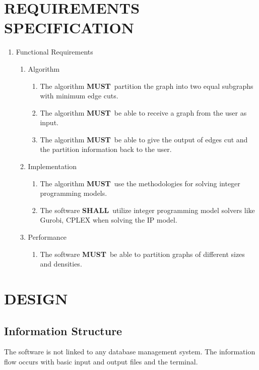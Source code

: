 \documentclass[a4paper,12pt]{report}
\newcommand{\must}{\textbf{MUST}}
\newcommand{\shall}{\textbf{SHALL}}
\begin{document}
\chapter{REQUIREMENTS SPECIFICATION}

\begin{enumerate}
	\item Functional Requirements
		\begin{enumerate}
			\item Algorithm
				\begin{enumerate}
					\item The algorithm \must\ partition the graph into two equal subgraphs with minimum edge cuts.
					\item The algorithm \must\ be able to receive a graph from the user as input.
					\item The algorithm \must\ be able to give the output of edges cut and the partition information back to the user.
				\end{enumerate}

			\item Implementation
				\begin{enumerate}
					\item The algorithm \must\ use the methodologies for solving integer programming models.
					\item The software \shall\ utilize integer programming model solvers like Gurobi, CPLEX when solving the IP model.
				\end{enumerate}
			\item Performance
				\begin{enumerate}
					\item The software \must\ be able to partition graphs of different sizes and densities.
				\end{enumerate}
		\end{enumerate}

\end{enumerate}


\chapter{DESIGN}

\section{Information Structure}

The software is not linked to any database management system. The information flow occurs with basic input and output files and the terminal.
\end{document}
